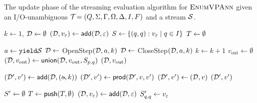
\begin{algorithm}[t]
\caption{The update phase of the streaming evaluation algorithm for $\textsc{EnumVPAnn}$ given an I/O-unambiguous \vpann $\mathcal{T}\! = (Q, \Sigma, \Gamma, \Omega, \Delta, I, F)$ and a stream $\mathcal{S}$.}\label{nested:alg:preprocessing}
\begin{varwidth}[t]{0.5\textwidth}
\begin{algorithmic}[1]
\label{nested:line1}
\State $k\gets 1$, $\mathcal{D}\gets\emptyset$\label{nested:line2}
\State $(\mathcal{D},v_\varepsilon)\gets\mathsf{add}(\mathcal{D},\varepsilon)$\label{nested:line3}
\State $S\gets \{(q,q): v_\varepsilon \mid q \in I\}$
\State $T \gets \emptyset$\label{nested:line4}
\EndProcedure	

\State
	
\label{nested:line6}
\State $a \gets \texttt{yield}{\mathcal{S}}$\label{nested:line7}
 \label{nested:line8}
  \State $\mathcal{D} \gets $ {\sc OpenStep}$(\mathcal{D}, a,k)$  \label{nested:line9}
 \label{nested:line10}
  \State $\mathcal{D} \gets $ {\sc CloseStep}$(\mathcal{D}, a,k)$\label{nested:line11}
 \EndIf 
 \State $k\gets k+1$\label{nested:line12}
 \State $v_{\text{out}} \gets \emptyset$\label{nested:line13}
 \label{nested:line14}
	 \label{nested:line15}
	 \State $(\mathcal{D},v_{\text{out}}) \gets \mathsf{union}(\mathcal{D},v_{\text{out}},S_{p,q})$\label{nested:line16}
 \EndFor
 \EndIf 
 $(\mathcal{D}, v_{\text{out}})$\label{nested:line17}
\EndProcedure

\State

\label{nested:line19}
\label{nested:line20}
\State $(\D',v') \gets \add(\D,(\oout, k))$\label{nested:line21}
\State $(\mathcal{D}',v') \gets \mathsf{prod}(\mathcal{D}',v,v')$\label{nested:line22}
\Else
\State $(\mathcal{D}',v') \gets (\mathcal{D}, v)$\label{nested:line24}
\EndIf
\State \Return $(\mathcal{D}',v')$\label{nested:line25}
\EndProcedure
{}
\end{algorithmic}	
\end{varwidth}
\hfill
\begin{varwidth}[t]{0.5\textwidth}
\begin{algorithmic}[1]
\State $S'\gets\emptyset$ 
\State $T\gets\mathsf{push}(T,\emptyset)$\label{nested:line27}
\label{nested:line29}
\label{nested:line30}
\State $(\mathcal{D},v_{\varepsilon}) \gets \mathsf{add}(\mathcal{D},\varepsilon)$\label{nested:line31}
\State $S'_{q,q}\gets v_{\varepsilon}$\label{nested:line32}
\EndIf


\end{algorithmic}
\end{varwidth}
\end{algorithm}
